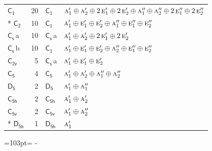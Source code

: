 \documentclass[10pt,a4paper]{article}
\newcommand{\needspace}[1]{\par\penalty-100\begingroup\dimen0=#1\relax\dimen2=\pagegoal
  \advance\dimen2-\pagetotal\ifdim\dimen0>\dimen2\relax\ifdim\dimen2>0pt\vfil\break\fi\fi
  \endgroup}
\numberwithin{equation}{section}
\newcommand{\grp}[1]{\mathsf{#1}}
\newcommand{\irr}[1]{\text{\normalfont\scshape #1}}
\newcommand{\clsletter}[1]{\,{\scriptsize\color{black!55}#1}}
\newlength{\fillwidth}\newlength{\cellwidth}\newlength{\colwidth}
\begin{document}
{\begin{longtable}{@{}lrl>{\RaggedRight\arraybackslash}p{\fillwidth}@{}}
\bottomrule\endfoot\endlastfoot
\href{C1.pdf}{$\grp{C_{1}}$} & 20 & \href{C1.pdf}{$\grp{C_{1}}$} & $\irr{a}_{1}'\oplus \irr{a}_{2}'\oplus 2\,\irr{e}_{1}'\oplus 2\,\irr{e}_{2}'\oplus \irr{a}_{1}''\oplus \irr{a}_{2}''\oplus 2\,\irr{e}_{1}''\oplus 2\,\irr{e}_{2}''$\\*
\href{C2.pdf}{$\grp{C_{2}}$} & 10 & \href{C1.pdf}{$\grp{C_{1}}$} & $\irr{a}_{1}'\oplus \irr{e}_{1}'\oplus \irr{e}_{2}'\oplus \irr{a}_{1}''\oplus \irr{e}_{1}''\oplus \irr{e}_{2}''$\\
\href{C1v.pdf}{$\grp{C_{s}}$}\clsletter{a} & 10 & \href{C1v.pdf}{$\grp{C_{s}}$}\clsletter{a} & $\irr{a}_{1}'\oplus \irr{a}_{2}'\oplus 2\,\irr{e}_{1}'\oplus 2\,\irr{e}_{2}'$\\
\href{C1v.pdf}{$\grp{C_{s}}$}\clsletter{b} & 10 & \href{C1.pdf}{$\grp{C_{1}}$} & $\irr{a}_{1}'\oplus \irr{e}_{1}'\oplus \irr{e}_{2}'\oplus \irr{a}_{2}''\oplus \irr{e}_{1}''\oplus \irr{e}_{2}''$\\
\href{C2v.pdf}{$\grp{C_{2v}}$} & 5 & \href{C1v.pdf}{$\grp{C_{s}}$}\clsletter{a} & $\irr{a}_{1}'\oplus \irr{e}_{1}'\oplus \irr{e}_{2}'$\\
\href{C5.pdf}{$\grp{C_{5}}$} & 4 & \href{C5.pdf}{$\grp{C_{5}}$} & $\irr{a}_{1}'\oplus \irr{a}_{2}'\oplus \irr{a}_{1}''\oplus \irr{a}_{2}''$\\
\href{D5.pdf}{$\grp{D_{5}}$} & 2 & \href{D5.pdf}{$\grp{D_{5}}$} & $\irr{a}_{1}'\oplus \irr{a}_{1}''$\\
\href{C5h.pdf}{$\grp{C_{5h}}$} & 2 & \href{C5h.pdf}{$\grp{C_{5h}}$} & $\irr{a}_{1}'\oplus \irr{a}_{2}'$\\
\href{C5v.pdf}{$\grp{C_{5v}}$} & 2 & \href{C5v.pdf}{$\grp{C_{5v}}$} & $\irr{a}_{1}'\oplus \irr{a}_{2}''$\\*
\href{D5h.pdf}{$\grp{D_{5h}}$} & 1 & \href{D5h.pdf}{$\grp{D_{5h}}$} & $\irr{a}_{1}'$\\
\bottomrule\end{longtable}}
\needspace{103pt}
\end{document}
